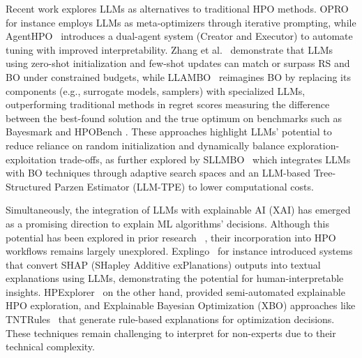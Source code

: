 \documentclass{article}
\begin{document}
Recent work explores LLMs as alternatives to traditional HPO methods. OPRO~\cite{yang2023large} for instance employs LLMs as meta-optimizers through iterative prompting, while AgentHPO~\cite{liu2024largeBO} introduces a dual-agent system (Creator and Executor) to automate tuning with improved interpretability. Zhang et al.~\cite{zhang2023using} demonstrate that LLMs using zero-shot initialization and few-shot updates can match or surpass RS and BO under constrained budgets, while LLAMBO~\cite{liu2024large} reimagines BO by replacing its components (e.g., surrogate models, samplers) with specialized LLMs, outperforming traditional methods in regret scores measuring the difference between the best-found solution and the true optimum on benchmarks such as Bayesmark \cite{turnerbayesmark} and HPOBench \cite{eggensperger2021hpobench}. These approaches highlight LLMs' potential to reduce reliance on random initialization and dynamically balance exploration-exploitation trade-offs, as further explored by SLLMBO~\cite{mahammadli2024sequential} which integrates LLMs with BO techniques through adaptive search spaces and an LLM-based Tree-Structured Parzen Estimator (LLM-TPE) to lower computational costs.


Simultaneously, the integration of LLMs with explainable AI (XAI) has emerged as a promising direction to explain ML algorithms' decisions. Although this potential  has been  explored in prior research ~\cite{kroeger2024incontextexplainersharnessingllms, 2023burtonxaiml,bhattacharjee2024llmguidedcausalexplainabilityblackbox}, their incorporation into HPO workflows remains largely unexplored. Explingo~\cite{zytek2024explingo} for instance introduced systems that convert SHAP (SHapley Additive exPlanations)\cite{lundberg2017unified} outputs into textual explanations using LLMs, demonstrating the potential for human-interpretable insights. HPExplorer~\cite{grushetskaya-2024} on the other hand, provided semi-automated explainable HPO exploration, and Explainable Bayesian Optimization (XBO) approaches like TNTRules~\cite{chakraborty2024explainable} that generate rule-based explanations for optimization decisions. These techniques remain challenging to interpret for non-experts due to their technical complexity.
\end{document}
